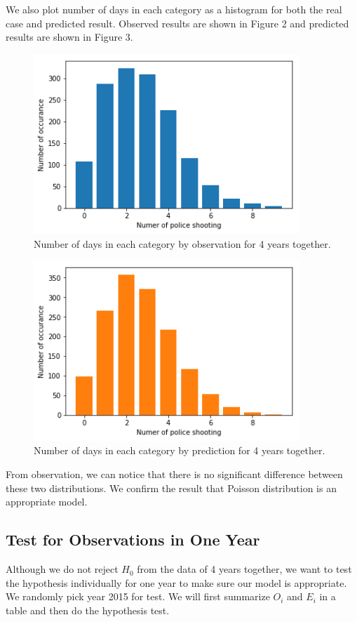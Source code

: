 \documentclass[11pt,a4paper,english]{article}
\begin{document}
We also plot number of days in each category as a histogram for both the real case and predicted result. Observed results are shown in Figure 2 and predicted results are shown in Figure 3.
\begin{figure}[htbp]
	\centering
	\includegraphics[width = 10cm]{4-years.png}
	\caption{Number of days in each category by observation for 4 years together.}
\end{figure}
\begin{figure}[htbp]
	\centering
	\includegraphics[width = 10cm]{poisson.png}
	\caption{Number of days in each category by prediction for 4 years together.}
\end{figure}

From observation, we can notice that there is no significant difference between these two distributions. We confirm the result that Poisson distribution is an appropriate model.
\subsection{Test for Observations in One Year}
Although we do not reject $H_{0}$ from the data of 4 years together, we want to test the hypothesis individually for one year to make sure our model is appropriate. We randomly pick year 2015 for test. We will first summarize $O_{i}$ and $E_{i}$ in a table and then do the hypothesis test.
\end{document}
